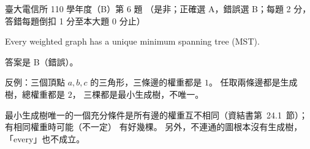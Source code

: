 \begin{pastexam}[label={px:ntu-110-comm-dsa-06}]{臺大電信所 110 學年度（B）第 6 題}
（是非；正確選 A，錯誤選 B；每題 2 分，答錯每題倒扣 1 分至本大題 0 分止）

Every weighted graph has a unique minimum spanning tree (MST).
\end{pastexam}

\begin{pastsoln}
答案是 B（錯誤）。

反例：三個頂點 $a, b, c$ 的三角形，三條邊的權重都是 $1$。 任取兩條邊都是生成樹，總權重都是 $2$，
三棵都是最小生成樹，不唯一。

最小生成樹唯一的一個充分條件是所有邊的權重互不相同（資結書第~24.1~節）；有相同權重時可能（不一定）
有好幾棵。 另外，不連通的圖根本沒有生成樹，「every」也不成立。
\end{pastsoln}
